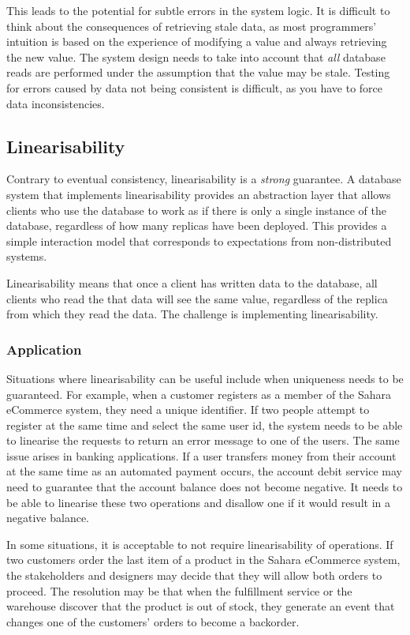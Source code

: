 This leads to the potential for subtle errors in the system logic.
It is difficult to think about the consequences of retrieving stale data,
as most programmers' intuition is based on the experience of modifying a value and always retrieving the new value.
The system design needs to take into account that \emph{all} database reads are performed under the assumption that the value may be stale.
Testing for errors caused by data not being consistent is difficult, as you have to force data inconsistencies.

\subsection{Linearisability}

Contrary to eventual consistency, linearisability is a \emph{strong} guarantee.
A database system that implements linearisability provides an abstraction layer
that allows clients who use the database to work as if there is only a single instance of the database,
regardless of how many replicas have been deployed.
This provides a simple interaction model that corresponds to expectations from non-distributed systems.

Linearisability means that once a client has written data to the database,
all clients who read the that data will see the same value, regardless of the replica from which they read the data.
The challenge is implementing linearisability.

\subsubsection{Application}

Situations where linearisability can be useful include when uniqueness needs to be guaranteed.
For example, when a customer registers as a member of the Sahara eCommerce system,
they need a unique identifier.
If two people attempt to register at the same time and select the same user id,
the system needs to be able to linearise the requests to return an error message to one of the users.
The same issue arises in banking applications.
If a user transfers money from their account at the same time as an automated payment occurs,
the account debit service may need to guarantee that the account balance does not become negative.
It needs to be able to linearise these two operations and disallow one if it would result in a negative balance.

In some situations, it is acceptable to not require linearisability of operations.
If two customers order the last item of a product in the Sahara eCommerce system,
the stakeholders and designers may decide that they will allow both orders to proceed.
The resolution may be that when the fulfillment service or the warehouse discover that
the product is out of stock, they generate an event that changes one of the customers' orders to become a backorder.


